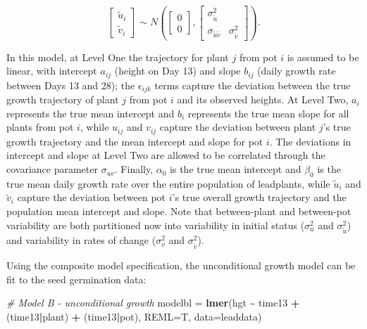 \documentclass[
]{krantz}
\newenvironment{Shaded}{\begin{snugshade}}{\end{snugshade}}
\newcommand{\AttributeTok}[1]{\textcolor[rgb]{0.27,0.27,0.27}{#1}}
\newcommand{\CommentTok}[1]{\textcolor[rgb]{0.37,0.37,0.37}{\textit{#1}}}
\newcommand{\FunctionTok}[1]{\textcolor[rgb]{0.27,0.27,0.27}{\textbf{#1}}}
\newcommand{\NormalTok}[1]{#1}
\newcommand{\OtherTok}[1]{\textcolor[rgb]{0.37,0.37,0.37}{#1}}
\newcommand{\SpecialCharTok}[1]{\textcolor[rgb]{0.43,0.43,0.43}{\textbf{#1}}}
\begin{document}
\[ \left[ \begin{array}{c}
            \tilde{u}_{i} \\ \tilde{v}_{i}
          \end{array}  \right] \sim N \left( \left[
          \begin{array}{c}
            0 \\ 0
          \end{array} \right], \left[
          \begin{array}{cc}
            \sigma_{\tilde{u}}^{2} & \\
            \sigma_{\tilde{u}\tilde{v}} & \sigma_{\tilde{v}}^{2}
          \end{array} \right] \right). \]

In this model, at Level One the trajectory for plant \(j\) from pot \(i\) is assumed to be linear, with intercept \(a_{ij}\) (height on Day 13) and slope \(b_{ij}\) (daily growth rate between Days 13 and 28); the \(\epsilon_{ijk}\) terms capture the deviation between the true growth trajectory of plant \(j\) from pot \(i\) and its observed heights. At Level Two, \(a_{i}\) represents the true mean intercept and \(b_{i}\) represents the true mean slope for all plants from pot \(i\), while \(u_{ij}\) and \(v_{ij}\) capture the deviation between plant \(j\)'s true growth trajectory and the mean intercept and slope for pot \(i\). The deviations in intercept and slope at Level Two are allowed to be correlated through the covariance parameter \(\sigma_{uv}\). Finally, \(\alpha_{0}\) is the true mean intercept and \(\beta_{0}\) is the true mean daily growth rate over the entire population of leadplants, while \(\tilde{u}_{i}\) and \(\tilde{v}_{i}\) capture the deviation between pot \(i\)'s true overall growth trajectory and the population mean intercept and slope. Note that between-plant and between-pot variability are both partitioned now into variability in initial status (\(\sigma_{u}^{2}\) and \(\sigma_{\tilde{u}}^{2}\)) and variability in rates of change (\(\sigma_{v}^{2}\) and \(\sigma_{\tilde{v}}^{2}\)).

Using the composite model specification, the unconditional growth model can be fit to the seed germination data:

\begin{Shaded}
\begin{Highlighting}[]
\CommentTok{\# Model B {-} unconditional growth}
\NormalTok{modelbl }\OtherTok{=} \FunctionTok{lmer}\NormalTok{(hgt }\SpecialCharTok{\textasciitilde{}}\NormalTok{ time13 }\SpecialCharTok{+}\NormalTok{ (time13}\SpecialCharTok{|}\NormalTok{plant) }\SpecialCharTok{+}\NormalTok{ (time13}\SpecialCharTok{|}\NormalTok{pot),}
               \AttributeTok{REML=}\NormalTok{T, }\AttributeTok{data=}\NormalTok{leaddata)}
\end{Highlighting}
\end{Shaded}
\end{document}
